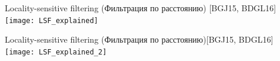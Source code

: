 \documentclass[usenames,dvipsnames, 9pt]{beamer}
\begin{document}
\begin{frame}{Locality-sensitive filtering (Фильтрация по расстоянию) [BGJ15, BDGL16]}
\texttt{[image: LSF\_explained]}
\end{frame}

\begin{frame}{Locality-sensitive filtering (Фильтрация по расстоянию)[BGJ15, BDGL16]}
\texttt{[image: LSF\_explained\_2]}
\end{frame}

\end{document}
